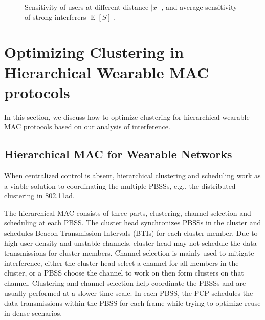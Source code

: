 \documentclass[10pt, conference, letterpaper]{IEEEtran}
\DeclareMathOperator*{\E}{\mathrm{E}}
\begin{document}
\begin{figure}
	\centering
	 \hfill
	
	\caption[]{Sensitivity of users at different distance $|x|$ , and average sensitivity of strong interferers $\E[S]$ .}
	\label{fig:channel:sensitivity}
\end{figure}




\section{Optimizing Clustering in Hierarchical Wearable MAC protocols}\label{section:clustering}
In this section, we discuss how to optimize clustering for hierarchical wearable MAC protocols based on our analysis of interference.


\subsection{Hierarchical MAC for Wearable Networks}\label{section:clustering:hierarchy}
When centralized control is absent, hierarchical clustering and scheduling work as a viable solution to coordinating the multiple PBSSs, e.g., the distributed clustering in 802.11ad. 


The hierarchical MAC consists of three parts, clustering, channel selection and scheduling at each PBSS. 
The cluster head synchronizes PBSSs in the cluster and schedules Beacon Transmission Intervals (BTIs) for each cluster member. 
Due to high user density and unstable channels, cluster head may not schedule the data transmissions for cluster members.
Channel selection is mainly used to mitigate interference, either the cluster head select a channel for all members in the cluster, or a PBSS choose the channel to work on then form clusters on that channel. 
Clustering and channel selection help coordinate the PBSSs and are usually performed at a slower time scale. 
In each PBSS, the PCP schedules the data transmissions within the PBSS for each frame while trying to optimize reuse in dense scenarios. 
\end{document}
